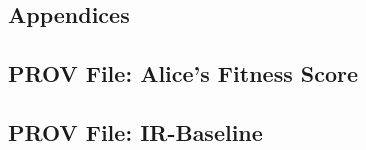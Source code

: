 \newcommand{\multipdf}[3][]{
	\label{sec:#2}
	
	
}

\newcommand{\singlepdf}[2]{
	
}

\begin{appendices}
	\stopcontents[sections]
	\chapter*{Appendices}
	\startcontents[appendix]
	\renewcommand{\thesection}{\appendixname~\Alph{section}}

	\singlepdf{Provenance Primer}{pdfs/provenance-primer.pdf}

	\multipdf{Interview Questionnaire}{pdfs/questionnaire.pdf}

	\section{PROV File: Alice's Fitness Score}
	\label{sec:prov_file_fitness_score}
	
	

	\clearpage

	\section{PROV File: IR-Baseline}
	\label{sec:prov_file_ir_baseline}
	
	

\end{appendices}

